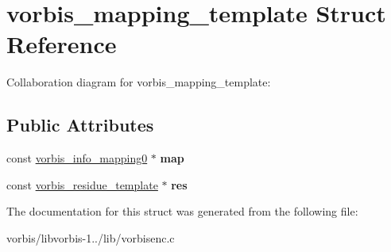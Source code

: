 \hypertarget{structvorbis__mapping__template}{\section{vorbis\+\_\+mapping\+\_\+template Struct Reference}
\label{structvorbis__mapping__template}
}


Collaboration diagram for vorbis\+\_\+mapping\+\_\+template\+:
\subsection*{Public Attributes}
\begin{DoxyCompactItemize}
\item 
\hypertarget{structvorbis__mapping__template_aa3f97dc5e56ab02a477dadbdddc2dd74}{const \hyperlink{structvorbis__info__mapping0}{vorbis\+\_\+info\+\_\+mapping0} $\ast$ {\bfseries map}}\label{structvorbis__mapping__template_aa3f97dc5e56ab02a477dadbdddc2dd74}

\item 
\hypertarget{structvorbis__mapping__template_a93ca70f5c4a50d4d75c83cfb62a55327}{const \hyperlink{structvorbis__residue__template}{vorbis\+\_\+residue\+\_\+template} $\ast$ {\bfseries res}}\label{structvorbis__mapping__template_a93ca70f5c4a50d4d75c83cfb62a55327}

\end{DoxyCompactItemize}


The documentation for this struct was generated from the following file\+:\begin{DoxyCompactItemize}
\item 
vorbis/libvorbis-\/1../lib/vorbisenc.\+c\end{DoxyCompactItemize}
